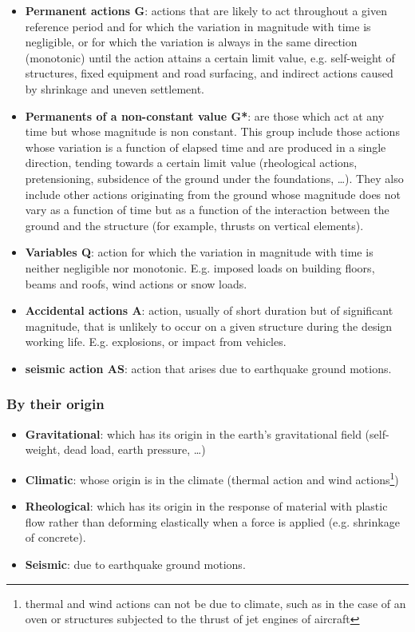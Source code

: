 \begin{itemize}
\item \textbf{Permanent actions G}: actions that are likely to act throughout a given reference period and for which the variation in magnitude with time is negligible, or for which the variation is always in the same direction (monotonic) until the action attains a certain limit value, e.g. self-weight of structures, fixed equipment and road surfacing, and indirect actions caused by shrinkage and uneven settlement.
\item \textbf{Permanents of a non-constant value G*}: are those which act at any time but whose magnitude is non constant. This group include those actions whose variation is a function of elapsed time and are produced in a single direction, tending towards a certain limit value (rheological actions, pretensioning, subsidence of the ground under the foundations, \ldots). They also include other actions originating from the ground whose magnitude does not vary as a function of time but as a function of the interaction between the ground and the structure (for example, thrusts on vertical elements).
\item \textbf{Variables Q}: action for which the variation in magnitude with time is neither negligible nor monotonic. E.g. imposed loads on building floors, beams and roofs, wind actions or snow loads.  

\item \textbf{Accidental actions A}: action, usually of short duration but of significant magnitude, that is unlikely to occur
on a given structure during the design working life. E.g. explosions, or impact from vehicles.

\item \textbf{seismic action AS}: action that arises due to earthquake ground motions.

\end{itemize}

\subsubsection{By their origin}
\begin{itemize}
\item \textbf{Gravitational}: which has its origin in the earth's gravitational field (self-weight, dead load, earth pressure, \ldots)
\item \textbf{Climatic}: whose origin is in the climate (thermal action and wind actions\footnote{thermal and wind actions can not be due to climate, such as in the case of an oven or structures subjected to the thrust of jet engines of aircraft})
\item \textbf{Rheological}: which has its origin in the response of material with plastic flow rather than deforming elastically when a force is applied (e.g. shrinkage of concrete).
\item \textbf{Seismic}: due to earthquake ground motions.
\end{itemize}






